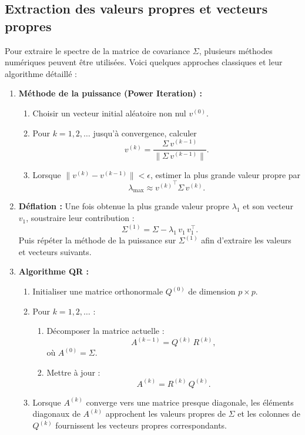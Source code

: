 \documentclass[a4paper,12pt]{report}
\begin{document}
\subsection{Extraction des valeurs propres et vecteurs propres}
Pour extraire le spectre de la matrice de covariance \(\Sigma\), plusieurs méthodes numériques peuvent être utilisées. Voici quelques approches classiques et leur algorithme détaillé :

\begin{enumerate}
    \item \textbf{Méthode de la puissance (Power Iteration) :}
    \begin{enumerate}
        \item Choisir un vecteur initial aléatoire non nul \(v^{(0)}\).
        \item Pour \(k=1,2,\ldots\) jusqu'à convergence, calculer
        \[
        v^{(k)} = \frac{\Sigma\, v^{(k-1)}}{\|\Sigma\, v^{(k-1)}\|}.
        \]
        \item Lorsque \(\|v^{(k)} - v^{(k-1)}\| < \epsilon\), estimer la plus grande valeur propre par
        \[
        \lambda_{\max} \approx {v^{(k)}}^\top \Sigma\, v^{(k)}.
        \]
    \end{enumerate}
    \item \textbf{Déflation :}  
    Une fois obtenue la plus grande valeur propre \(\lambda_1\) et son vecteur \(v_1\), soustraire leur contribution :
    \[
    \Sigma^{(1)} = \Sigma - \lambda_1\, v_1\, v_1^\top.
    \]
    Puis répéter la méthode de la puissance sur \(\Sigma^{(1)}\) afin d'extraire les valeurs et vecteurs suivants.
    
    \item \textbf{Algorithme QR :}
    \begin{enumerate}
        \item Initialiser une matrice orthonormale \(Q^{(0)}\) de dimension \(p\times p\).
        \item Pour \(k=1,2,\ldots\) :
        \begin{enumerate}
            \item Décomposer la matrice actuelle :
            \[
            A^{(k-1)} = Q^{(k)}\, R^{(k)},
            \]
            où \(A^{(0)} = \Sigma\).
            \item Mettre à jour :
            \[
            A^{(k)} = R^{(k)}\, Q^{(k)}.
            \]
        \end{enumerate}
        \item Lorsque \(A^{(k)}\) converge vers une matrice presque diagonale, les éléments diagonaux de \(A^{(k)}\) approchent les valeurs propres de \(\Sigma\) et les colonnes de \(Q^{(k)}\) fournissent les vecteurs propres correspondants.
    \end{enumerate}
    

\end{enumerate}
\end{document}
